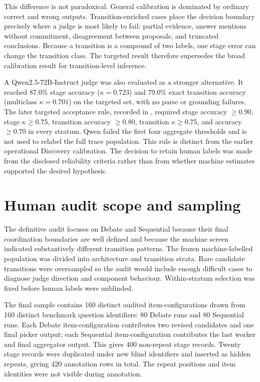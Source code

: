 This difference is not paradoxical. General calibration is dominated by ordinary correct and wrong outputs. Transition-enriched cases place the decision boundary precisely where a judge is most likely to fail: partial evidence, answer mentions without commitment, disagreement between proposals, and truncated conclusions. Because a transition is a compound of two labels, one stage error can change the transition class. The targeted result therefore supersedes the broad calibration result for transition-level inference.

A Qwen2.5-72B-Instruct judge was also evaluated as a stronger alternative. It reached 87.0\% stage accuracy ($\kappa=0.723$) and 79.0\% exact transition accuracy (multiclass $\kappa=0.701$) on the targeted set, with no parse or grounding failures. The later targeted acceptance rule, recorded in , required stage accuracy $\geq0.90$, stage $\kappa\geq0.75$, transition accuracy $\geq0.80$, transition $\kappa\geq0.75$, and accuracy $\geq0.70$ in every stratum. Qwen failed the first four aggregate thresholds and is not used to relabel the full trace population. This rule is distinct from the earlier operational Discovery calibration. The decision to retain human labels was made from the disclosed reliability criteria rather than from whether machine estimates supported the desired hypothesis.

\section{Human audit scope and sampling}
\label{sec:audit-sampling}

The definitive audit focuses on Debate and Sequential because their final coordination boundaries are well defined and because the machine screen indicated substantively different transition patterns. The frozen machine-labelled population was divided into architecture and transition strata. Rare candidate transitions were oversampled so the audit would include enough difficult cases to diagnose judge direction and component behaviour. Within-stratum selection was fixed before human labels were unblinded.

The final sample contains 160 distinct audited item-configurations drawn from 160 distinct benchmark question identifiers: 80 Debate runs and 80 Sequential runs. Each Debate item-configuration contributes two revised candidates and one final picker output; each Sequential item-configuration contributes the last worker and final aggregator output. This gives 400 non-repeat stage records. Twenty stage records were duplicated under new blind identifiers and inserted as hidden repeats, giving 420 annotation rows in total. The repeat positions and item identities were not visible during annotation.

